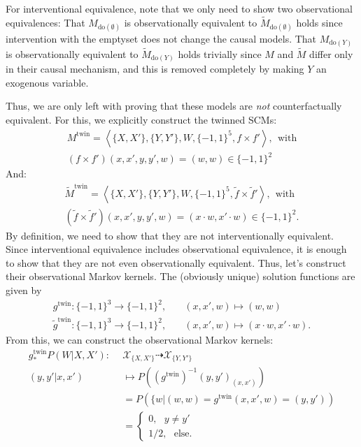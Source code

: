 \begin{enumerate}
\begin{gradedsolution}
\begin{enumerate}
	For interventional equivalence, note that we only need to show two observational equivalences: 
	That $M_{\text{do}(\emptyset)}$ is observationally equivalent to $\tilde{M}_{\text{do}(\emptyset)}$ holds since intervention with the emptyset does not change the causal models.
	That $M_{\text{do}(Y)}$ is observationally equivalent to $\tilde{M}_{\text{do}(Y)}$ holds trivially since $M$ and $\tilde{M}$ differ only in their causal mechanism, and this is removed completely by making $Y$ an exogenous variable.

	Thus, we are only left with proving that these models are \emph{not} counterfactually equivalent. 
	For this, we explicitly construct the twinned SCMs:
	\begin{align*}
		M^{\text{twin}} = \left\langle \{X, X'\}, \{Y, Y'\}, W, \{-1,1\}^5, f \times f' \right\rangle, \ \ \text{with} \\
		(f\times f')(x, x', y, y', w)  = (w, w) \in \{-1,1\}^2
	\end{align*}
	And:
	\begin{align*}
		\tilde{M}^{\text{twin}} = \left\langle \{X, X'\}, \{Y, Y'\}, W, \{-1,1\}^5, \tilde{f} \times \tilde{f}' \right\rangle, \ \ \text{with} \\
		(\tilde{f} \times \tilde{f}')(x, x', y, y', w) = (x \cdot w, x' \cdot w) \in \{-1, 1\}^2.
	\end{align*}
	By definition, we need to show that they are not interventionally equivalent. 
	Since interventional equivalence includes observational equivalence, it is enough to show that they are not even observationally equivalent.
	Thus, let's construct their observational Markov kernels.
	The (obviously unique) solution functions are given by 
	\begin{align*}
		g^{\text{twin}}: \{-1,1\}^3 \to \{-1,1\}^2, & \quad (x, x', w) \mapsto (w, w) \\
		\tilde{g}^{\text{twin}}: \{-1,1\}^3 \to \{-1,1\}^2, & \quad (x, x', w) \mapsto (x \cdot w, x' \cdot w).
	\end{align*}
	From this, we can construct the observational Markov kernels:
	\begin{align*}
		g^{\text{twin}}_* P(W | X, X'): \ \ & \mathcal{X}_{\{X,X'\}} \dashrightarrow \mathcal{X}_{\{Y,Y'\}} \\
		(y, y' | x, x') & \mapsto P\left((g^{\text{twin}})^{-1}(y, y')_{(x,x')}\right) \\
		& = P\left(\{w | (w,w) = g^{\text{twin}}(x, x', w) = (y, y')\right) \\
		& = \begin{cases} 0, \ \ \ y \neq y' \\ 1/2, \ \ \ \text{else}.\end{cases}

\end{align*}
\end{enumerate}
\end{gradedsolution}
\end{enumerate}
